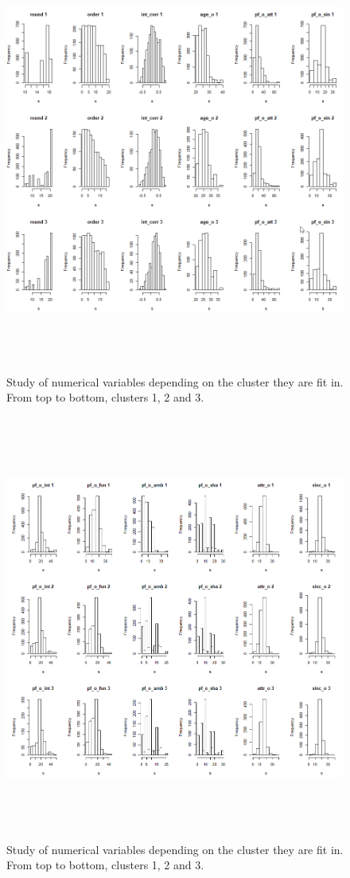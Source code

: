 \begin{figure}
  \centering
  \includegraphics[width= 16cm, height=14cm]{images/profiling/CPG_cluster_numerical_round_pfosin.png}
  \caption{Study of numerical variables depending on the cluster they are fit in. From top to bottom, clusters 1, 2 and 3.}
  \label{fig:indiv}
\end{figure}

\begin{figure}
  \centering
  \includegraphics[width= 16cm, height=14cm]{images/profiling/CPG_cluster_numerical_pfoint_sinco.png}
  \caption{Study of numerical variables depending on the cluster they are fit in. From top to bottom, clusters 1, 2 and 3.}
  \label{fig:indiv}
\end{figure}

